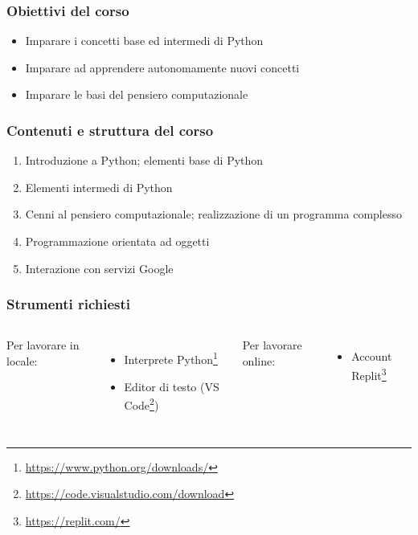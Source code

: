 
\begin{contentframe}
    \frametitle{Obiettivi del corso}

    \begin{itemize}
        \item Imparare i concetti base ed intermedi di Python
        
        \bigskip
        \item Imparare ad apprendere autonomamente nuovi concetti

        \bigskip
        \item Imparare le basi del pensiero computazionale
    \end{itemize}
\end{contentframe}

\begin{contentframe}
    \frametitle{Contenuti e struttura del corso}

    \begin{enumerate}
        \item Introduzione a Python; elementi base di Python
        \item Elementi intermedi di Python
        \item Cenni al pensiero computazionale; realizzazione di un programma complesso
        \item Programmazione orientata ad oggetti
        \item Interazione con servizi Google
    \end{enumerate}
\end{contentframe}

\begin{contentframe}
    \frametitle{Strumenti richiesti}

    \begin{columns}
        Per lavorare in locale:
        \begin{itemize}    
            \item Interprete Python\footnote[frame]{\url{https://www.python.org/downloads/}}
            \item Editor di testo (VS Code\footnote[frame]{\url{https://code.visualstudio.com/download}})
        \end{itemize}

        Per lavorare online:
        \begin{itemize}
            \item Account Replit\footnote[frame]{\url{https://replit.com/}}
            \bigskip
        \end{itemize}
    \end{columns}
\end{contentframe}

